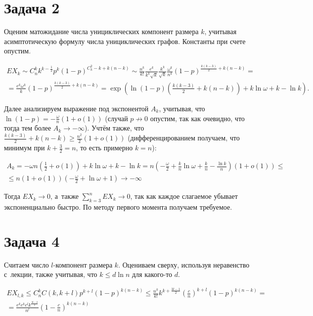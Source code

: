 \documentclass{article}
\theoremstyle{definition}
\theoremstyle{remark}
\renewcommand{\le}{\leqslant}
\renewcommand{\ge}{\geqslant}
\begin{document}
\section*{Задача 2}

Оценим матожидание числа унициклических компонент размера $k$, учитывая асимптотическую
формулу числа унициклических графов. Константы при счете опустим.

\begin{multline*}
	EX_k \sim C_n^k k^{k-\frac{1}{2}} p^k (1-p)^{C_k^2-k+k(n-k)} \sim
	\frac{n^k}{k!} \frac{e^k}{k^k \sqrt{k}} \frac{k^k}{\sqrt{k}} \frac{\omega^k}{n^k}
	(1-p)^{\frac{k(k-3)}{2} + k(n-k)} =\\
	=\frac{e^k \omega^k}{k} (1-p)^{\frac{k(k-3)}{2} + k(n-k)} = \exp\left( \ln(1-p) \left(
	\frac{k(k-3)}{2}+k(n-k)\right) + k \ln \omega + k - \ln k\right).
\end{multline*}

Далее анализируем выражение под экспонентой $A_k$, учитывая, что $\ln(1-p) = -\frac{\omega}{n} (1 +
o(1))$ (случай $p \not\rightarrow 0$ опустим, так как очевидно, что тогда тем более $A_k \rightarrow
-\infty$). Учтём также, что $\frac{k(k-3)}{2} + k(n-k) \ge \frac{n^2}{2}(1+o(1))$
(дифференцированием получаем, что минимум при $k + \frac{3}{2} = n$, то есть примерно $k = n$):

\begin{multline*}
	A_k = -\omega n(\frac{1}{2}+o(1)) + k \ln \omega + k - \ln k = n\left(-\frac{\omega}{2} +
	\frac{k}{n}\ln \omega + \frac{k}{n} - \frac{\ln k}{n}\right) (1 + o(1)) \le\\
	\le n(1 + o(1))\left(-\frac{\omega}{2} + \ln \omega + 1\right) \rightarrow -\infty
\end{multline*}

Тогда $EX_k \rightarrow 0$, а~также $\sum\limits_{k=3}^n EX_k \rightarrow 0$, так как каждое
слагаемое убывает экспоненциально быстро. По методу первого момента получаем требуемое.

\section*{Задача 4}

Считаем число $l$-компонент размера $k$. Оцениваем сверху, используя неравенство с~лекции, также
учитывая, что $k \le d \ln n$ для какого-то $d$.

\begin{multline*}
	EX_{l,k} \le C_n^k C(k, k + l) p^{k+l} (1-p)^{k(n-k)} \le \frac{n^k}{k!} k^{k+\frac{3l-1}{2}}
	\left(\frac{c}{n}\right)^{k+l} (1-p)^{k(n-k)} =\\
	= \frac{e^k c^k c^l k^\frac{3l-2}{2}}{n^l} \left(1-\frac{c}{n}\right)^{k(n-k)}
\end{multline*}
\end{document}
